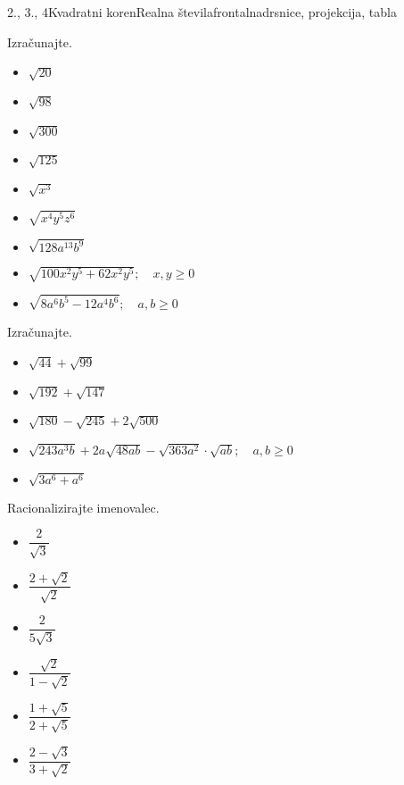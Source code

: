 \begin{priprava}{2., 3., 4}{}{Kvadratni koren}{Realna števila}{frontalna}{drsnice, projekcija, tabla}
\begin{multicols}{2}
            \begin{naloga}
                Izračunajte.
                \begin{itemize}
                        \item $\sqrt{20}$ 
                        \item $\sqrt{98}$ 
                        \item $\sqrt{300}$ 
                        \item $\sqrt{125}$ 
                        \item $\sqrt{x^3}$ 
                        \item $\sqrt{x^4y^5z^6}$ 
                        \item $\sqrt{128a^{13}b^9}$ 
                        \item $\sqrt{100x^2y^5+62x^2y^5}; \quad x,y\geq 0$ 
                        \item $\sqrt{8a^6b^5-12a^4b^6}; \quad a,b\geq 0$ 
                \end{itemize}
            \end{naloga}
        


        
            \begin{naloga}
                Izračunajte.
                \begin{itemize}
                        \item $\sqrt{44}+\sqrt{99}$ 
                        \item $\sqrt{192}+\sqrt{147}$ 
                        \item $\sqrt{180}-\sqrt{245}+2\sqrt{500}$ 
                        \item $\sqrt{243a^3b}+2a\sqrt{48ab}-\sqrt{363a^2}\cdot\sqrt{ab}; \quad a,b\geq 0$ 
                        \item $\sqrt{3a^6+a^6}$ 
                \end{itemize}
            \end{naloga}
        


        
            \begin{naloga}
                Racionalizirajte imenovalec.
                \begin{itemize}
                        \item $\dfrac{2}{\sqrt{3}}$ 
                        \item $\dfrac{2+\sqrt{2}}{\sqrt{2}}$ 
                        \item $\dfrac{2}{5\sqrt{3}}$ 
                        \item $\dfrac{\sqrt{2}}{1-\sqrt{2}}$ 
                        \item $\dfrac{1+\sqrt{5}}{2+\sqrt{5}}$ 
                        \item $\dfrac{2-\sqrt{3}}{3+\sqrt{2}}$ 
                \end{itemize}
            \end{naloga}
        



\end{multicols}
\end{priprava}
